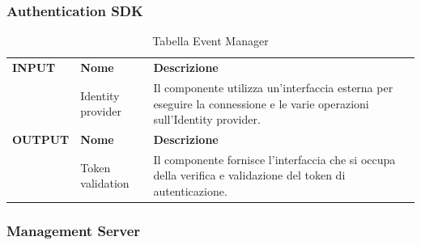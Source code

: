 \documentclass{article}
\begin{document}
\subsubsection{Authentication SDK}

\begin{table}[htbp]
    \centering
    \renewcommand{\arraystretch}{1.3} %
    \begin{tabularx}{\textwidth}{| l | l | X |}
        \Xhline{2pt}
        \textbf{INPUT} & \textbf{Nome} & \textbf{Descrizione} \\
        \Xhline{2pt}
         & Identity provider & Il componente utilizza un'interfaccia esterna per eseguire la connessione e le varie operazioni sull'Identity provider. \\
        \Xhline{2pt}
        \textbf{OUTPUT} & \textbf{Nome} & \textbf{Descrizione} \\
        \Xhline{2pt}
         & Token validation & Il componente fornisce l'interfaccia che si occupa della verifica e validazione del token di autenticazione. \\
        \hline
    \end{tabularx}
    \caption{Tabella Event Manager}
\end{table}

\clearpage

\subsubsection{Management Server}
\end{document}
